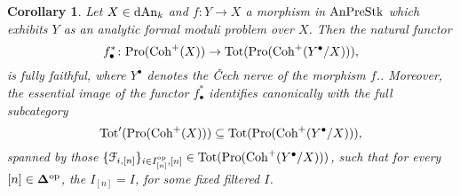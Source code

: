 \documentclass[10pt,a4paper,reqno]{amsart} %
\theoremstyle{plain}
\newtheorem{cor}[thm]{Corollary}
\theoremstyle{definition}
\theoremstyle{remark}
\numberwithin{equation}{section}
\begin{document}
\begin{cor} \label{cor:pseudo_nil-descent_for_pro_Coh^+}
    Let $X \in \mathrm{dAn}_k$ and $f \colon Y \to X$ a morphism in $\mathrm{AnPreStk}$ which exhibits $Y$ as an analytic formal moduli problem over $X$.
    Then the natural functor 
        \[
            f_\bullet^* \colon \mathrm{Pro}(\mathrm{Coh}^+ (X)) \to \mathrm{Tot}(\mathrm{Pro}(\mathrm{Coh}^+(Y^\bullet/X))),
        \]
    is fully faithful, where $Y^\bullet$ denotes the \v{C}ech nerve of the morphism $f$.. Moreover, the essential image of the functor $f_\bullet^*$ identifies canonically with the full subcategory
        \[
            \mathrm{Tot}'(\mathrm{Pro}(\mathrm{Coh}^+(X))) \subseteq \mathrm{Tot}(\mathrm{Pro}(\mathrm{Coh}^+(Y^\bullet/ X)))  ,
        \]
    spanned by those $\{\mathcal F_{i, [n]} \}_{i \in I^\mathrm{op}_{[n]}, [n]} \in \mathrm{Tot}(\mathrm{Pro}(\mathrm{Coh}^+(Y^\bullet/X)))$, such that for every $[n] \in \bm{\Delta} ^\mathrm{op}$,
    the \infcats $I_{[n]} = I$, for some fixed filtered \infcat $I$.
\end{cor}
\end{document}
